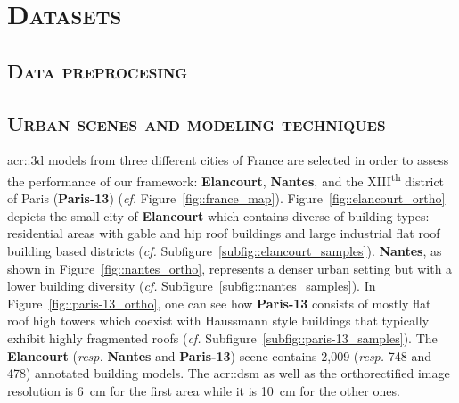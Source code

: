 \minitoc

\vfill

\clearpage

\section{\textsc{Datasets}}
    \label{sec::experiments::datasets}
    
    \subsection{\textsc{Data preprocesing}}
        \label{subsec::experiments::datasets::preprocessing}

    \subsection{\textsc{Urban scenes and modeling techniques}}
        \label{subsec::experiments::datasets::scenes}
        \gls{acr::3d} models from three different cities of France are selected in order to assess the performance of our framework: \textbf{Elancourt}, \textbf{Nantes}, and the XIII\textsuperscript{th} district of Paris (\textbf{Paris-13}) (\textit{cf.} Figure~\ref{fig::france_map}).
        Figure~\ref{fig::elancourt_ortho} depicts the small city of \textbf{Elancourt} which contains diverse of building types: residential areas with gable and hip roof buildings and large industrial flat roof building based districts (\textit{cf.} Subfigure~\ref{subfig::elancourt_samples}).
        \textbf{Nantes}, as shown in Figure~\ref{fig::nantes_ortho}, represents a denser urban setting but with a lower building diversity (\textit{cf.} Subfigure~\ref{subfig::nantes_samples}).
        In Figure~\ref{fig::paris-13_ortho}, one can see how \textbf{Paris-13} consists of mostly flat roof high towers which coexist with Haussmann style buildings that typically exhibit highly fragmented roofs (\textit{cf.} Subfigure~\ref{subfig::paris-13_samples}).
        The \textbf{Elancourt} (\textit{resp.} \textbf{Nantes} and \textbf{Paris-13}) scene contains 2,009 (\textit{resp.} 748 and 478) annotated building models.
        The \gls{acr::dsm} as well as the orthorectified image resolution is \SI{6}{\cm} for the first area while it is \SI{10}{\cm} for the other ones.


